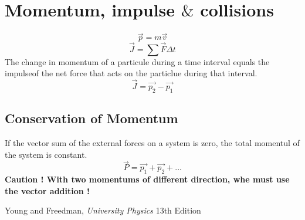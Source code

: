 \documentclass[a4paper,10pt]{article}
\begin{document}
\section{Momentum, impulse $\&$ collisions}
\[\vec{p} = m\vec{v}\]
\[\vec{J} = \sum{} \vec{F}\Delta t\]
The change in momentum of a particule during a time interval equals the impulseof the net force that acts on the particlue during that interval.
\[\vec{J} = \vec{p_2} - \vec{p_1}\]

\subsection{Conservation of Momentum}
If the vector sum of the external forces on a system is zero, the total momentul of the system is constant.
\[\vec{P} = \vec{p_1} + \vec{p_2} + ...\]
{ \bf Caution ! With two momentums of different direction, whe must use the vector addition !}

\begin{thebibliography}{9}

	Young and Freedman,
	\emph{University Physics}
	13th Edition

\end{thebibliography}
\end{document}
